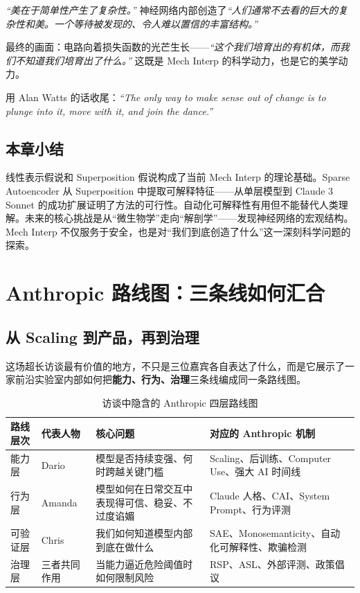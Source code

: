 \documentclass[a4paper]{article}
\begin{document}
\textit{``美在于简单性产生了复杂性。''} 神经网络内部创造了\textit{``人们通常不去看的巨大的复杂性和美。一个等待被发现的、令人难以置信的丰富结构。''}

最终的画面：电路向着损失函数的光芒生长——\textit{``这个我们培育出的有机体，而我们不知道我们培育出了什么。''} 这既是 Mech Interp 的科学动力，也是它的美学动力。

用 Alan Watts 的话收尾：\textit{``The only way to make sense out of change is to plunge into it, move with it, and join the dance.''}

\subsection{本章小结}

线性表示假说和 Superposition 假说构成了当前 Mech Interp 的理论基础。Sparse Autoencoder 从 Superposition 中提取可解释特征——从单层模型到 Claude 3 Sonnet 的成功扩展证明了方法的可行性。自动化可解释性有用但不能替代人类理解。未来的核心挑战是从``微生物学''走向``解剖学''——发现神经网络的宏观结构。Mech Interp 不仅服务于安全，也是对``我们到底创造了什么''这一深刻科学问题的探索。

\section{Anthropic 路线图：三条线如何汇合}

\subsection{从 Scaling 到产品，再到治理}

这场超长访谈最有价值的地方，不只是三位嘉宾各自表达了什么，而是它展示了一家前沿实验室内部如何把\textbf{能力、行为、治理}三条线编成同一条路线图。

\begin{table}[H]
\centering
\begin{tabular}{p{} p{} p{} p{}}
\toprule
路线层次 & 代表人物 & 核心问题 & 对应的 Anthropic 机制 \\
\midrule
能力层 & Dario & 模型是否持续变强、何时跨越关键门槛 & Scaling、后训练、Computer Use、强大 AI 时间线 \\
行为层 & Amanda & 模型如何在日常交互中表现得可信、稳妥、不过度谄媚 & Claude 人格、CAI、System Prompt、行为评测 \\
可验证层 & Chris & 我们如何知道模型内部到底在做什么 & SAE、Monosemanticity、自动化可解释性、欺骗检测 \\
治理层 & 三者共同作用 & 当能力逼近危险阈值时如何限制风险 & RSP、ASL、外部评测、政策倡议 \\
\bottomrule
\end{tabular}
\caption{访谈中隐含的 Anthropic 四层路线图}
\end{table}
\end{document}
